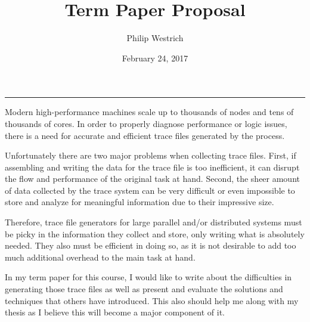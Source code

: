 \documentclass[12pt]{article}
\title{Term Paper Proposal}
\author{Philip Westrich}
\date{February 24, 2017}
\begin{document}
\maketitle

\vspace{-0.3in}
\noindent
\rule{\linewidth}{0.4pt}
\doublespacing

Modern high-performance machines scale up to thousands of nodes and tens of thousands of cores. In order to properly 
diagnose performance or logic issues, there is a need for accurate and efficient trace files generated by the process. 

Unfortunately there are two major problems when collecting trace files. First, if assembling and writing the data for 
the trace file is too inefficient, it can disrupt the flow and performance of the original task at hand. Second, the 
sheer amount of data collected by the trace system can be very difficult or even impossible to store and analyze for 
meaningful information due to their impressive size.

Therefore, trace file generators for large parallel and/or distributed systems must be picky in the information they 
collect and store, only writing what is absolutely needed. They also must be efficient in doing so, as it is not 
desirable to add too much additional overhead to the main task at hand.

In my term paper for this course, I would like to write about the difficulties in generating those trace files as well 
as present and evaluate the solutions and techniques that others have introduced. This also should help me along with 
my thesis as I believe this will become a major component of it.
\end{document}
